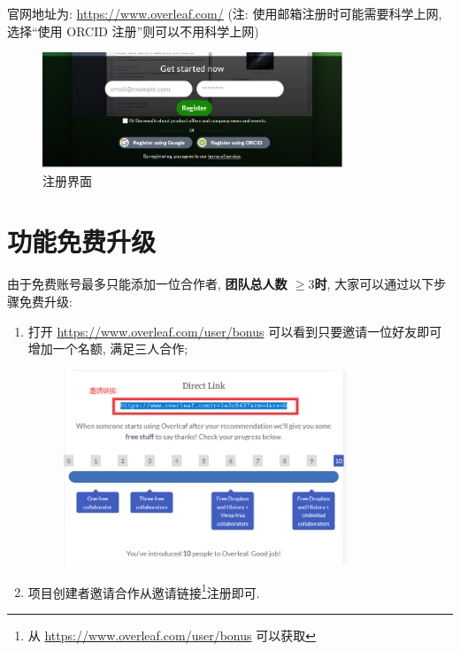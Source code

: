 \documentclass{booki}
\begin{document}
官网地址为: \url{https://www.overleaf.com/} (注: 使用邮箱注册时可能需要科学上网, 选择``使用 ORCID 注册''则可以不用科学上网)

\begin{figure}[H]
    \centering
    \includegraphics[width=0.8\textwidth]{Guidepics/20210415183938.png}
    \caption{注册界面}
\end{figure}

\section{功能免费升级}\label{header-n5}

由于免费账号最多只能添加一位合作者, \textbf{团队总人数 \( \geq3\)时},
大家可以通过以下步骤免费升级:

\begin{enumerate}
    \item 打开 \url{https://www.overleaf.com/user/bonus}
          可以看到只要邀请一位好友即可增加一个名额, 满足三人合作;
          \begin{figure}[H]
              \centering
              \includegraphics[width=0.8\textwidth]{Guidepics/20210415183943.png}
          \end{figure}
    \item 项目创建者邀请合作从邀请链接\footnote{从 \url{https://www.overleaf.com/user/bonus} 可以获取}注册即可.
\end{enumerate}
\end{document}
